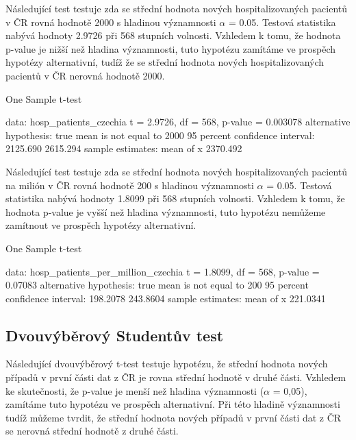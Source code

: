 \documentclass[a4paper, 12pt]{article}
\begin{document}
Následující test testuje zda se střední hodnota nových hospitalizovaných pacientů v ČR rovná
hodnotě 2000 s hladinou významnosti $\alpha$ = 0.05. Testová statistika nabývá hodnoty 2.9726 při 568 stupních volnosti. Vzhledem k tomu, že hodnota p-value je nižší než hladina významnosti, tuto hypotézu zamítáme ve prospěch hypotézy alternativní, tudíž že se střední hodnota
nových hospitalizovaných pacientů v ČR nerovná hodnotě 2000.
\begin{Schunk}
\begin{Soutput}
	One Sample t-test

data:  hosp_patients_czechia
t = 2.9726, df = 568, p-value = 0.003078
alternative hypothesis: true mean is not equal to 2000
95 percent confidence interval:
 2125.690 2615.294
sample estimates:
mean of x 
 2370.492 
\end{Soutput}
\end{Schunk}

\clearpage

Následující test testuje zda se střední hodnota nových hospitalizovaných pacientů na milión v ČR rovná
hodnotě 200 s hladinou významnosti $\alpha$ = 0.05. Testová statistika nabývá hodnoty 1.8099 při 568 stupních volnosti. Vzhledem k tomu, že hodnota p-value je vyšší než hladina významnosti, tuto hypotézu nemůžeme zamítnout ve prospěch hypotézy alternativní.
\begin{Schunk}
\begin{Soutput}
	One Sample t-test

data:  hosp_patients_per_million_czechia
t = 1.8099, df = 568, p-value = 0.07083
alternative hypothesis: true mean is not equal to 200
95 percent confidence interval:
 198.2078 243.8604
sample estimates:
mean of x 
 221.0341 
\end{Soutput}
\end{Schunk}

\clearpage

\subsection{Dvouvýběrový Studentův test}

Následující dvouvýběrový t-test testuje hypotézu, že střední hodnota nových případů v
první části dat z ČR je rovna střední hodnotě v druhé části. Vzhledem ke skutečnosti, že p-value je menší
než hladina významnosti ($\alpha$ = 0,05), zamítáme tuto hypotézu ve prospěch alternativní.
Při této hladině významnosti tudíž můžeme tvrdit, že střední hodnota nových případů v první
části dat z ČR se nerovná střední hodnotě z druhé části.
\end{document}
